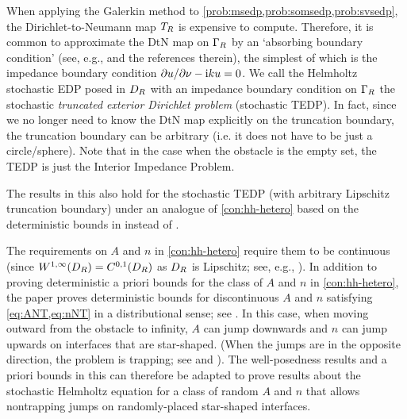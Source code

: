 
\label{rem:tedp}
When applying the Galerkin method to \cref{prob:msedp,prob:somsedp,prob:svsedp}, the Dirichlet-to-Neumann map $T_{R}$ is expensive to compute. Therefore, it is
common to approximate the DtN map on $\Gamma_{R}$ by an `absorbing
boundary condition' (see, e.g., \cite[Section 3.3]{Ih:98} and the references
therein), the  simplest of which is the impedance boundary condition
$\partial u/\partial \nu - \mathrm{i} k u=0$. We call the Helmholtz stochastic EDP posed in $D_{R}$ with
an impedance boundary condition on $\Gamma_{R}$ the stochastic \emph{truncated
exterior Dirichlet problem} (stochastic TEDP). In fact, since we no longer need to know
the DtN map explicitly on the truncation boundary, the truncation
boundary can be arbitrary (i.e. it does not have to be just a circle/sphere). Note that in the case when the obstacle is the empty set, the TEDP is just the Interior Impedance Problem.

The results in this  also hold for the stochastic TEDP (with arbitrary Lipschitz truncation boundary) under an analogue of \cref{con:hh-hetero} based on the deterministic bounds in \cite[Theorem A.6(i)]{GrPeSp:19} instead of \cite[Theorem 2.5]{GrPeSp:19}.
\ere

\label{rem:jumps}
The requirements on $A$ and $n$ in \cref{con:hh-hetero} require them to be continuous (since  $\WoiDR = \CzoDR$ as $D_{R}$ is Lipschitz; see, e.g., \cite[Section 4.2.3, Theorem 5]{EvGa:92}). In addition to proving deterministic a priori bounds for the class of $A$ and $n$ in \cref{con:hh-hetero}, the paper \cite{GrPeSp:19} proves deterministic bounds for discontinuous $A$ and $n$ satisfying \cref{eq:ANT,eq:nNT} in a distributional sense; see \cite[Theorem 2.7]{GrPeSp:19}. In this case, when moving outward from the obstacle to infinity,  $A$ can jump downwards and $n$ can
jump upwards on interfaces that are star-shaped. (When the jumps are in the opposite direction, the problem is trapping; see \cite{PoVo:99a} and \cite[Section 6]{MoSp:19}). The
well-posedness results and a priori bounds in this  can therefore be adapted to prove results about the stochastic Helmholtz equation
for a class of random $A$ and $n$ that allows nontrapping jumps on randomly-placed star-shaped interfaces.
\ere

